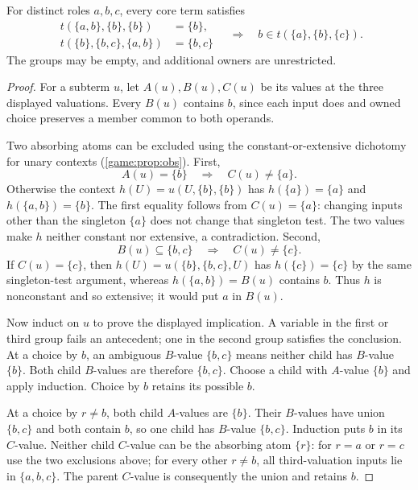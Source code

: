 \begin{proposition}\label{core:prop:persistence}
For distinct roles $a,b,c$, every core term satisfies
\[
\begin{split}
 t(\{a,b\},\{b\},\{b\})&=\{b\},\\
 t(\{b\},\{b,c\},\{a,b\})&=\{b,c\}
\end{split}
\quad\Longrightarrow\quad
 b\in t(\{a\},\{b\},\{c\}).
\]
The groups may be empty, and additional owners are unrestricted.
\end{proposition}
\begin{proof}
For a subterm $u$, let $A(u),B(u),C(u)$ be its values at the three
displayed valuations. Every $B(u)$ contains $b$, since each input does
and owned choice preserves a member common to both operands.

Two absorbing atoms can be excluded using the constant-or-extensive
dichotomy for unary contexts (\cref{game:prop:obs}). First,
\[
 A(u)=\{b\}\quad\Longrightarrow\quad C(u)\ne\{a\}.
\]
Otherwise the context $h(U)=u(U,\{b\},\{b\})$ has
$h(\{a\})=\{a\}$ and $h(\{a,b\})=\{b\}$. The first equality
follows from $C(u)=\{a\}$: changing inputs other than the singleton
$\{a\}$ does not change that singleton test. The two values make
$h$ neither constant nor extensive, a contradiction.
Second,
\[
 B(u)\subseteq\{b,c\}\quad\Longrightarrow\quad C(u)\ne\{c\}.
\]
If $C(u)=\{c\}$, then $h(U)=u(\{b\},\{b,c\},U)$ has
$h(\{c\})=\{c\}$ by the same singleton-test argument, whereas
$h(\{a,b\})=B(u)$ contains $b$. Thus $h$ is nonconstant and so
extensive; it would put $a$ in $B(u)$.

Now induct on $u$ to prove the displayed implication. A variable in
the first or third group fails an antecedent; one in the second group
satisfies the conclusion. At a choice by $b$, an ambiguous $B$-value
$\{b,c\}$ means neither child has $B$-value $\{b\}$. Both child
$B$-values are therefore $\{b,c\}$. Choose a child with $A$-value
$\{b\}$ and apply induction. Choice by $b$ retains its possible $b$.

At a choice by $r\ne b$, both child $A$-values are $\{b\}$.
Their $B$-values have union $\{b,c\}$ and both contain $b$, so one
child has $B$-value $\{b,c\}$. Induction puts $b$ in its $C$-value.
Neither child $C$-value can be the absorbing atom $\{r\}$: for
$r=a$ or $r=c$ use the two exclusions above; for every other
$r\ne b$, all third-valuation inputs lie in $\{a,b,c\}$.
The parent $C$-value is consequently the union and retains $b$.
\end{proof}

